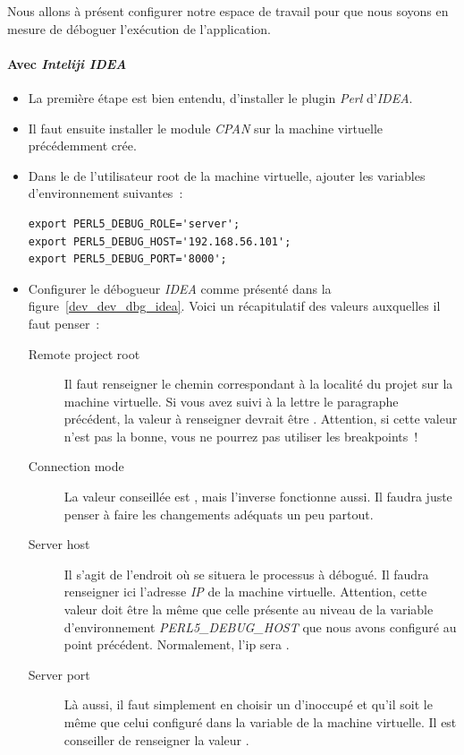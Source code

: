 Nous allons à présent configurer notre espace de travail pour que nous soyons en mesure de déboguer l'exécution de l'application.

\paragraph{Avec \emph{Inteliji IDEA}}

\begin{itemize}
	\item La première étape est bien entendu, d'installer le plugin \emph{Perl} d'\emph{IDEA}.
	\item Il faut ensuite installer le module \emph{CPAN}  sur la machine virtuelle précédemment crée.
	\item Dans le  de l'utilisateur root de la machine virtuelle, ajouter les variables d'environnement suivantes~:
		\begin{lstlisting}
export PERL5_DEBUG_ROLE='server';
export PERL5_DEBUG_HOST='192.168.56.101';
export PERL5_DEBUG_PORT='8000';
		\end{lstlisting}
	\item Configurer le débogueur \emph{IDEA} comme présenté dans la figure~\ref{dev_dev_dbg_idea}.
		Voici un récapitulatif des valeurs auxquelles il faut penser~:
		\begin{description}
			\item[Remote project root] Il faut renseigner le chemin correspondant à la localité du projet sur la machine virtuelle. Si vous avez suivi à la lettre le paragraphe précédent, la valeur à renseigner devrait être . Attention, si cette valeur n'est pas la bonne, vous ne pourrez pas utiliser les breakpoints~!
			\item[Connection mode] La valeur conseillée est , mais l'inverse fonctionne aussi. Il faudra juste penser à faire les changements adéquats un peu partout.
			\item[Server host] Il s'agit de l'endroit où se situera le processus à débogué. Il faudra renseigner ici l'adresse \emph{IP} de la machine virtuelle. Attention, cette valeur doit être la même que celle présente au niveau de la variable d'environnement \emph{PERL5\_DEBUG\_HOST} que nous avons configuré au point précédent. Normalement, l'ip sera .
			\item[Server port] Là aussi, il faut simplement en choisir un d'inoccupé et qu'il soit le même que celui configuré dans la variable  de la machine virtuelle. Il est conseiller de renseigner la valeur .
		\end{description}
\end{itemize}

